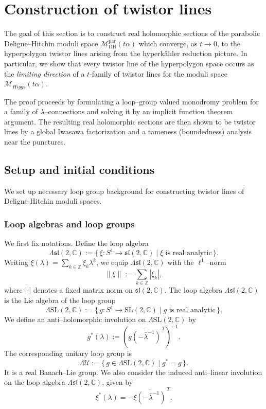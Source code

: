 \documentclass[12pt,a4paper]{amsart}
\theoremstyle{definition}
\theoremstyle{remark}
\newcommand{\C}{\mathbb C}
\newcommand{\Mcal}{\mathcal M}
\begin{document}
\section{Construction of twistor lines}\label{sec:construction}
The goal of this section is to construct 
real holomorphic sections of the parabolic Deligne--Hitchin moduli space
$\Mcal_{\mathrm{DH}}^{\mathrm{par}}(t\alpha)$ which converge,
as $t\to 0$, to the hyperpolygon twistor lines arising from the hyperk\"ahler reduction picture.
In particular,  we show that every twistor line of the hyperpolygon space occurs as the
\emph{limiting direction} of a $t$-family of twistor lines for the moduli space 
$\Mcal_{Higgs}(t\alpha)$.

The proof proceeds by formulating a loop--group valued monodromy problem for a family of
$\lambda$--connections and solving it by an implicit function theorem argument.
The resulting real holomorphic sections are then shown to be twistor lines by a global
Iwasawa factorization and a tameness (boundedness) analysis near the punctures.


\subsection{Setup and initial conditions}\label{sec:setupIFT}
We set up necessary loop group background for constructing twistor lines
of  Deligne-Hitchin moduli spaces.

\subsubsection*{Loop algebras and loop groups}
We first fix notations.
Define the loop algebra
\[
\Lambda\mathfrak{sl}(2,\C)
:=
\{\,\xi\colon S^1\to\mathfrak{sl}(2,\C) \mid \xi \text{ is real analytic}\,\}.
\]
Writing $\xi(\lambda)=\sum_{k\in\mathbb Z}\xi_k\lambda^k$, we equip
$\Lambda\mathfrak{sl}(2,\C)$ with the $\ell^1$--norm
\[
\|\xi\|
:=
\sum_{k\in\mathbb Z}|\xi_k|,
\]
where $|\cdot|$ denotes a fixed matrix norm on $\mathfrak{sl}(2,\C)$.
The loop algebra $\Lambda\mathfrak{sl}(2,\C)$ is the Lie algebra of the loop group
\[
\Lambda\mathrm{SL}(2,\C)
:=
\{\, g\colon S^1\to \mathrm{SL}(2,\C)\mid g \text{ is real analytic}\,\}.
\]
We define an anti--holomorphic involution on $\Lambda\mathrm{SL}(2,\C)$ by
\[
g^*(\lambda)
:=
\left(\overline{g(-\bar\lambda^{-1})}^{\,T}\right)^{-1}.
\]
The corresponding unitary loop group is
\[
\Lambda\mathcal U
:=
\{\, g\in \Lambda\mathrm{SL}(2,\C)\mid g^*=g\,\}.
\]
It is a real Banach--Lie group.
We also consider the induced  anti--linear involution
on the loop algebra $\Lambda\mathfrak{sl}(2,\C)$, given by
\[
\xi^*(\lambda)
=
-\overline{\xi(-\bar\lambda^{-1})}^{\,T}.
\]
\end{document}
